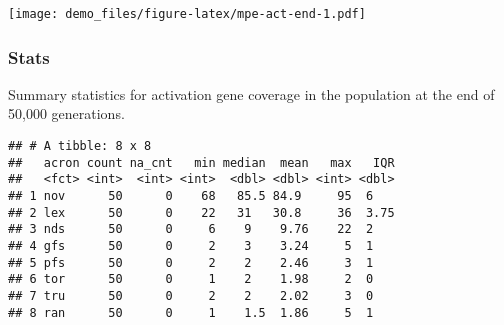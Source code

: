 \documentclass[]{book}
\newenvironment{Shaded}{\begin{snugshade}}{\end{snugshade}}
\newcommand{\DataTypeTok}[1]{\textcolor[rgb]{0.13,0.29,0.53}{#1}}
\newcommand{\KeywordTok}[1]{\textcolor[rgb]{0.13,0.29,0.53}{\textbf{#1}}}
\newcommand{\NormalTok}[1]{#1}
\newcommand{\OperatorTok}[1]{\textcolor[rgb]{0.81,0.36,0.00}{\textbf{#1}}}
\newcommand{\OtherTok}[1]{\textcolor[rgb]{0.56,0.35,0.01}{#1}}
\newcommand{\StringTok}[1]{\textcolor[rgb]{0.31,0.60,0.02}{#1}}
\begin{document}
\texttt{[image: demo\_files/figure-latex/mpe-act-end-1.pdf]}

\hypertarget{stats-12}{%
\subsubsection{Stats}\label{stats-12}}

Summary statistics for activation gene coverage in the population at the end of 50,000 generations.

\begin{Shaded}
\end{Shaded}

\begin{verbatim}
## # A tibble: 8 x 8
##   acron count na_cnt   min median  mean   max   IQR
##   <fct> <int>  <int> <int>  <dbl> <dbl> <int> <dbl>
## 1 nov      50      0    68   85.5 84.9     95  6   
## 2 lex      50      0    22   31   30.8     36  3.75
## 3 nds      50      0     6    9    9.76    22  2   
## 4 gfs      50      0     2    3    3.24     5  1   
## 5 pfs      50      0     2    2    2.46     3  1   
## 6 tor      50      0     1    2    1.98     2  0   
## 7 tru      50      0     2    2    2.02     3  0   
## 8 ran      50      0     1    1.5  1.86     5  1
\end{verbatim}
\end{document}
